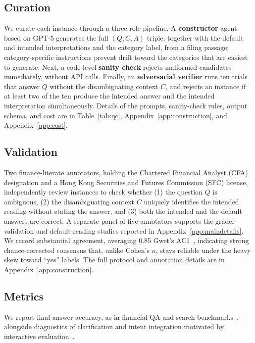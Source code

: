 \subsection{Curation}
\label{sec:construction}
We curate each instance through a three-role pipeline. A \textbf{constructor} agent based on GPT-5 generates the full $(Q, C, A)$ triple, together with the default and intended interpretations and the category label, from a filing passage; category-specific instructions prevent drift toward the categories that are easiest to generate. Next, a code-level \textbf{sanity check} rejects malformed candidates immediately, without API calls. Finally, an \textbf{adversarial verifier} runs ten trials that answer $Q$ without the disambiguating context $C$, and rejects an instance if at least two of the ten produce the intended answer and the intended interpretation simultaneously. Details of the prompts, sanity-check rules, output schema, and cost are in Table~\ref{tab:qc}, Appendix~\ref{app:construction}, and Appendix~\ref{app:cost}.

\subsection{Validation}
\label{sec:humanval}
Two finance-literate annotators, holding the Chartered Financial Analyst (CFA) designation and a Hong Kong Securities and Futures Commission (SFC) license, independently review instances to check whether (1) the question $Q$ is ambiguous, (2) the disambiguating context $C$ uniquely identifies the intended reading without stating the answer, and (3) both the intended and the default answers are correct. A separate panel of five annotators supports the grader-validation and default-reading studies reported in Appendix~\ref{app:maindetails}. We record substantial agreement, averaging 0.85 Gwet's AC1~\citep{gwet2008}, indicating strong chance-corrected consensus that, unlike Cohen's $\kappa$, stays reliable under the heavy skew toward ``yes'' labels. The full protocol and annotation details are in Appendix~\ref{app:construction}.

\subsection{Metrics}
\label{sec:metrics}

We report final-answer accuracy, as in financial QA and search benchmarks~\citep{chen2021finqa,islam2023financebench,wei2025browsecomp}, alongside diagnostics of clarification and intent integration motivated by interactive evaluation~\citep{interactcomp2026}.

